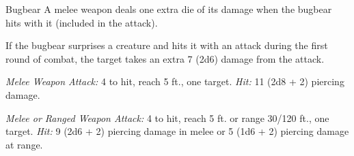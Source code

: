 \documentclass[10pt,a4paper,twoside,bg=print,twocolumn,openany,nodeprecatedcode]{dndbook}
\begin{document}
\begin{DndMonster}[float=t]{Bugbear}
\DndMonsterBasics[
armor-class = {16 (\textit{hide armor})},
hit-points = {\DndDice{5d8 + 5}},
speed = {30 ft.}
]
\DndMonsterAbilityScores[
 str = 15,
 dex = 14,
 con = 13,
 int = 8,
 wis = 11,
 cha = 9
]
\DndMonsterDetails[
skills = {Stealth +6, Survival +2},
senses = {darkvision 60 ft., passive perception 10},
languages = {Common, Goblin},
challenge = 1,
]
A melee weapon deals one extra die of its damage when the bugbear hits with it (included in the attack).

If the bugbear surprises a creature and hits it with an attack during the first round of combat, the target takes an extra 7 (2d6) damage from the attack.

\textsl{Melee Weapon Attack:} 4 to hit, reach 5 ft., one target. \textsl{Hit:} 11 (2d8 + 2) piercing damage.

\textsl{Melee or Ranged Weapon Attack:} 4 to hit, reach 5 ft. or range 30/120 ft., one target. \textsl{Hit:} 9 (2d6 + 2) piercing damage in melee or 5 (1d6 + 2) piercing damage at range.

\end{DndMonster}
\end{document}
